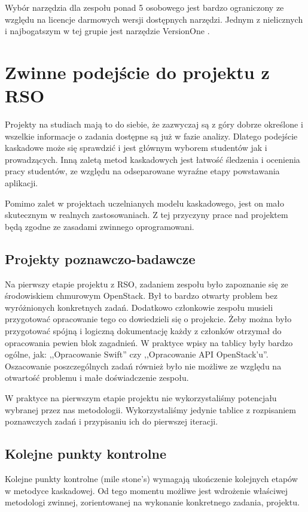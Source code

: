 Wybór narzędzia dla zespołu ponad 5 osobowego jest bardzo ograniczony ze względu na licencje darmowych wersji dostępnych narzędzi. Jednym z nielicznych i najbogatszym w tej grupie jest narzędzie VersionOne \cite{versionone}.
 
\section{Zwinne podejście do projektu z RSO}

Projekty na studiach mają to do siebie, że zazwyczaj są z góry dobrze określone i wszelkie informacje o zadania dostępne są już w fazie analizy. Dlatego podejście kaskadowe może się sprawdzić i jest głównym wyborem studentów jak i prowadzących. Inną zaletą metod kaskadowych jest łatwość śledzenia i ocenienia pracy studentów, ze względu na odseparowane wyraźne etapy powstawania aplikacji.

Pomimo zalet w projektach uczelnianych modelu kaskadowego, jest on mało skutecznym w realnych zastosowaniach. Z tej przyczyny prace nad projektem będą zgodne ze zasadami zwinnego oprogramowani.

\subsection{Projekty poznawczo-badawcze}

Na pierwszy etapie projektu z RSO, zadaniem zespołu było zapoznanie się ze środowiskiem chmurowym OpenStack. Był to bardzo otwarty problem bez wyróżnionych konkretnych zadań. Dodatkowo członkowie zespołu musieli przygotować opracowanie tego co dowiedzieli się o projekcie. Żeby można było przygotować spójną i logiczną dokumentację każdy z członków otrzymał do opracowania pewien blok zagadnień. W praktyce wpisy na tablicy były bardzo ogólne, jak: ,,Opracowanie Swift'' czy ,,Opracowanie API OpenStack'u''. Oszacowanie poszczególnych zadań również było nie możliwe ze względu na otwartość problemu i małe doświadczenie zespołu. 

W praktyce na pierwszym etapie projektu nie wykorzystaliśmy potencjału wybranej przez nas metodologii. Wykorzystaliśmy jedynie tablice z rozpisaniem poznawczych zadań i przypisaniu ich do pierwszej iteracji.

\subsection{Kolejne punkty kontrolne}

Kolejne punkty kontrolne (mile stone's) wymagają ukończenie kolejnych etapów w metodyce kaskadowej. Od tego momentu możliwe jest wdrożenie właściwej metodologi zwinnej, zorientowanej na wykonanie konkretnego zadania, projektu.

